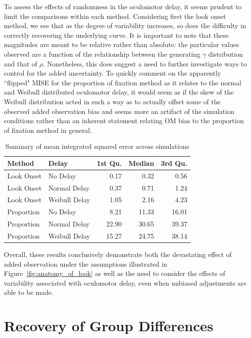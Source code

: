 \documentclass{article}
\begin{document}
To assess the effects of randomness in the oculomotor delay, it seems prudent to limit the comparisons within each method. Considering first the look onset method, we see that as the degree of variability increases, so does the difficulty in correctly recovering the underlying curve. It is important to note that these magnitudes are meant to be relative rather than absolute: the particular values observed are a function of the relationship between the generating $\gamma$ distribution and that of $\rho$. Nonetheless, this does suggest a need to further investigate ways to control for the added uncertainty. To quickly comment on the apparently ``flipped" MISE for the proportion of fixation method as it relates to the normal and Weibull distributed oculomotor delay, it would seem as if the skew of the Weibull distribution acted in such a way as to actually offset some of the observed added observation bias and seems more an artifact of the simulation conditions rather than an inherent statement relating OM bias to the proportion of fixation method in general.

\begin{table}[H]
\centering
\begin{tabular}{llrrr}
  \hline
Method & Delay & 1st Qu. & Median & 3rd Qu. \\ 
  \hline
Look Onset & No Delay & 0.17 & 0.32 & 0.56 \\ 
  Look Onset & Normal Delay & 0.37 & 0.71 & 1.24 \\ 
  Look Onset & Weibull Delay & 1.05 & 2.16 & 4.23 \\ 
  Proportion & No Delay & 8.21 & 11.33 & 16.01 \\ 
  Proportion & Normal Delay & 22.90 & 30.65 & 39.37 \\ 
  Proportion & Weibull Delay & 15.27 & 24.75 & 38.14 \\ 
   \hline
\end{tabular}
\caption{Summary of mean integrated squared error across simulations}
\label{tab:mise_sims}
\end{table}

Overall, these results conclusively demonstrate both the devastating effect of added observation under the assumptions illustrated in Figure~\ref{fig:anatomy_of_look} as well as the need to consider the effects of variability associated with oculomotor delay, even when unbiased adjustments are able to be made. 


\section{Recovery of Group Differences}
\end{document}
